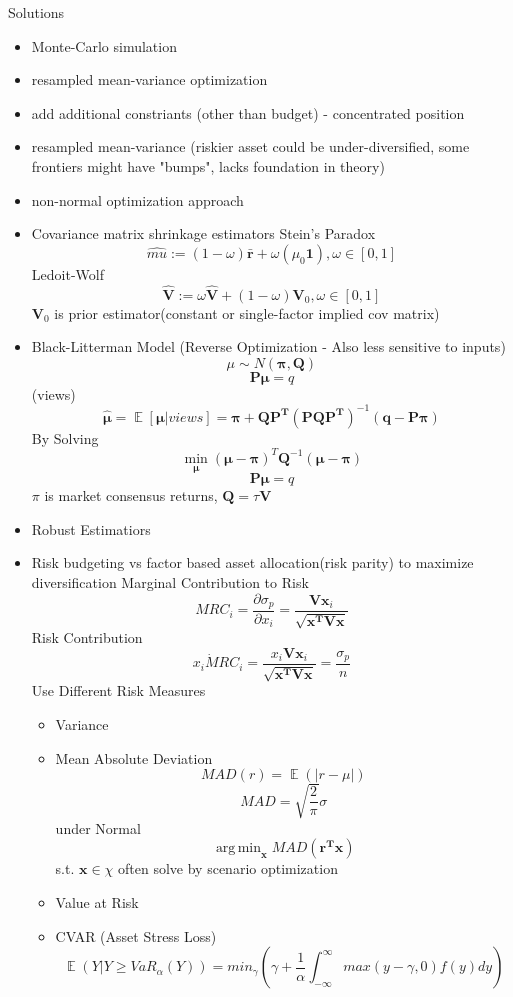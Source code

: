\documentclass[11pt, openany]{book}              %
\DeclareMathOperator*{\argmin}{arg\,min}  %
\DeclareMathOperator{\E}{\mathbb{E}}
\begin{document}
Solutions
\begin{itemize}
	\item Monte-Carlo simulation
	\item resampled mean-variance optimization
    \item add additional constriants (other than budget) - concentrated position
    \item resampled mean-variance
    	\subitem (riskier asset could be under-diversified, some frontiers might have "bumps", lacks foundation in theory)
    \item  non-normal optimization approach
     \item Covariance matrix shrinkage estimators
      \subitem Stein's Paradox 
      $$\hat{mu} := (1-\omega) \bar{\mathbf{r}} + \omega(\mu_0 \mathbf{1}),\omega \in [0,1]$$
      \subitem Ledoit-Wolf
      $$\hat{\mathbf{V}} := \omega\hat{\mathbf{V}} + (1-\omega)\mathbf{V}_0 ,\omega \in [0,1]$$
      $\mathbf{V}_0$ is prior estimator(constant or single-factor implied cov matrix) 
     \item Black-Litterman Model (Reverse Optimization - Also less sensitive to inputs)
     $$ \mu \sim N(\mathbf{\pi}, \mathbf{Q})$$
     $$ \boldsymbol{P\mu} = q$$ (views)
     $$ \hat{\boldsymbol{\mu}} = \E[\boldsymbol{\mu} | views] = \boldsymbol{\pi} + \mathbf{QP^T}(\mathbf{PQP^T})^{-1}(\mathbf{q} - \boldsymbol{P\pi})$$
     By Solving
     $$ \min_{\boldsymbol{\mu}}(\boldsymbol{\mu} - \boldsymbol{\pi})^T \mathbf{Q}^{-1}(\boldsymbol{\mu} - \boldsymbol{\pi}) $$
	$$\boldsymbol{P\mu} = q$$
     $\pi$ is market consensus returns, $\mathbf{Q} = \tau\mathbf{V}$
     \item Robust Estimatiors
     \item  Risk budgeting vs factor based asset allocation(risk parity) to maximize diversification
     \subitem Marginal Contribution to Risk $$MRC_i = \frac{\partial \sigma_p}{\partial x_i} = \frac{\boldsymbol{Vx}_i}{\sqrt{\mathbf{x^TVx}}}$$
     \subitem Risk Contribution $$ x_i \dot MRC_i = \frac{x_i \boldsymbol{Vx}_i}{\sqrt{\mathbf{x^TVx}}} = \frac{\sigma_p}{n}$$
     \subitem Use Different Risk Measures
      \begin{itemize}	
      	\item Variance
      	\item Mean Absolute Deviation $$MAD(r) = \E( |r-\mu|)$$ $$ MAD = \sqrt{\frac{2}{\pi}} \sigma $$ under Normal
      			$$ \argmin_{\mathbf{x}} MAD(\mathbf{r^Tx})$$
      			s.t. $\mathbf{x} \in \chi$ often solve by scenario optimization
      	\item Value at Risk
      	\item CVAR (Asset Stress Loss)
      	$$ \E(Y| Y \geq VaR_{\alpha}(Y)) = min_{\gamma} (\gamma + \frac{1}{\alpha} \int_{-\infty}^{\infty} max(y - \gamma, 0) f(y) dy)$$
      \end{itemize}
\end{itemize}	
\end{document}
